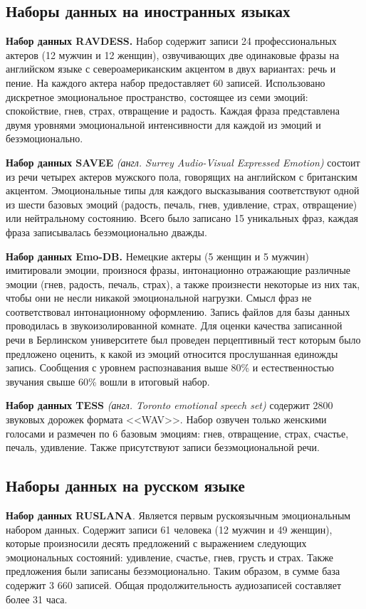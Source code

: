 \subsection{Наборы данных на иностранных языках}
\textbf{Набор данных RAVDESS.} \cite{ravdess} Набор содержит записи 24 профессиональных актеров (12 мужчин и 12 женщин), озвучивающих две одинаковые фразы на английском языке с североамериканским акцентом в двух вариантах: речь и пение. На каждого актера набор предоставляет 60 записей. Использовано дискретное эмоциональное пространство, состоящее из семи эмоций: спокойствие, гнев, страх, отвращение и радость. Каждая фраза представлена двумя уровнями эмоциональной интенсивности для каждой из эмоций и безэмоционально. 

\textbf{Набор данных  SAVEE} \cite{savee} \textit{(англ. Surrey Audio-Visual Expressed Emotion)} состоит из
речи четырех актеров мужского пола, говорящих на английском с британским акцентом. Эмоциональные типы для каждого высказывания соответствуют одной из шести базовых эмоций (радость, печаль, гнев, удивление, страх, отвращение) или нейтральному состоянию. Всего было записано 15 уникальных фраз, каждая фраза записывалась безэмоционально дважды.

\textbf{Набор данных Emo-DB.} \cite{emodb} Немецкие актеры (5 женщин и 5 мужчин) имитировали эмоции, произнося фразы, интонационно отражающие различные эмоции (гнев, радость, печаль, страх), а также произнести некоторые из них так, чтобы они не несли никакой эмоциональной нагрузки. Смысл фраз не соответствовал интонационному оформлению. Запись файлов для базы данных проводилась в звукоизолированной комнате. Для оценки качества записанной речи в Берлинском университете был проведен перцептивный тест которым было предложено оценить, к какой из эмоций относится прослушанная единожды запись. Сообщения с уровнем распознавания выше 80\% и естественностью звучания свыше 60\% вошли в итоговый набор.

\textbf{Набор данных  TESS} \cite{tess} \textit{(англ. Toronto emotional speech set)} содержит 2800 звуковых дорожек формата <<WAV>>. Набор озвучен только женскими голосами и размечен по 6 базовым эмоциям: гнев, отвращение, страх, счастье, печаль, удивление. Также присутствуют записи безэмоциональной речи.
\subsection{Наборы данных на русском языке}
\textbf{Набор данных RUSLANA}. \cite{ruslana} Является первым рускоязычным эмоциональным набором данных. Содержит записи 61 человека (12 мужчин и 49 женщин), которые произносили десять предложений с выражением следующих эмоциональных состояний: удивление, счастье, гнев, грусть и страх. Также предложения были записаны безэмоционально. Таким образом, в сумме база содержит 3 660 записей. Общая продолжительность аудиозаписей составляет более 31 часа. 


